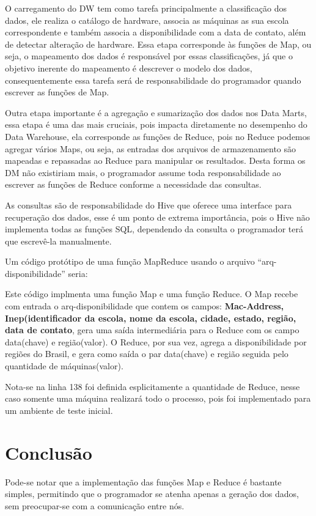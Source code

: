 \documentclass[a4paper,12pt]{article}
\begin{document}
O carregamento do DW tem como tarefa principalmente a classificação dos dados,
ele realiza o catálogo de hardware, associa as máquinas as sua escola
correspondente e também associa a disponibilidade com a data de contato, além de
detectar alteração de hardware. Essa etapa corresponde às funções de Map, ou
seja, o mapeamento dos dados é responsável por essas classificações, já que o
objetivo inerente do mapeamento é descrever o modelo dos dados, consequentemente
essa tarefa será de responsabilidade do programador quando escrever as funções
de Map.

Outra etapa importante é a agregação e sumarização dos dados nos Data Marts,
essa etapa é uma das mais cruciais, pois impacta diretamente no desempenho do
Data Warehouse, ela corresponde as funções de Reduce, pois no Reduce podemos
agregar vários Maps, ou seja, as entradas dos arquivos de armazenamento são
mapeadas e repassadas ao Reduce para manipular os resultados. Desta forma os DM
não existiriam mais, o programador assume toda responsabilidade ao escrever as
funções de Reduce conforme a necessidade das consultas.

As consultas são de responsabilidade do Hive que oferece uma interface para
recuperação dos dados, esse é um ponto de extrema importância, pois o Hive não
implementa todas as funções SQL, dependendo da consulta o programador terá que
escrevê-la manualmente.

Um código protótipo de uma função MapReduce usando o arquivo
“arq-disponibilidade” seria:



Este código implmenta uma função Map e uma função Reduce. O Map recebe com entrada
o arq-disponibilidade que contem os campos: \textbf{Mac-Address, Inep(identificador
da escola, nome da escola, cidade, estado, região, data de contato}, gera uma saída
intermediária para o Reduce com os campo data(chave) e região(valor). O Reduce,
por sua vez, agrega a disponibilidade por regiões do Brasil, e gera como saída
o par data(chave) e região seguida pelo quantidade de máquinas(valor).

Nota-se na linha 138 foi definida esplicitamente a quantidade de Reduce, nesse caso
somente uma máquina realizará todo o processo, pois foi implementado para um ambiente
de teste inicial.

\section{\textbf{Conclusão}}
Pode-se notar que a implementação das funções Map e Reduce é bastante simples,
permitindo que o programador se atenha apenas a geração dos dados, sem preocupar-se
com a comunicação entre nós.
\end{document}
